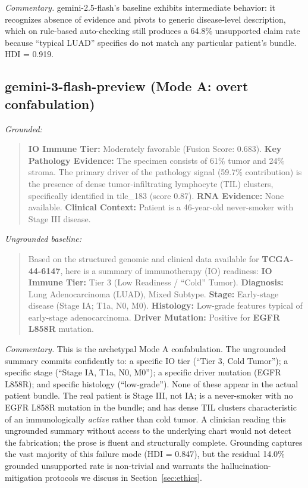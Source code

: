 \documentclass[11pt]{article}
\begin{document}
\emph{Commentary.} gemini-2.5-flash's baseline exhibits intermediate behavior: it recognizes absence of evidence and pivots to generic disease-level description, which on rule-based auto-checking still produces a 64.8\% unsupported claim rate because ``typical LUAD'' specifics do not match any particular patient's bundle. HDI = 0.919.

\subsection{gemini-3-flash-preview (Mode A: overt confabulation)}

\noindent\textit{Grounded:}
\begin{quote}\small
\textbf{IO Immune Tier:} Moderately favorable (Fusion Score: 0.683). \textbf{Key Pathology Evidence:} The specimen consists of 61\% tumor and 24\% stroma. The primary driver of the pathology signal (59.7\% contribution) is the presence of dense tumor-infiltrating lymphocyte (TIL) clusters, specifically identified in tile\_183 (score 0.87). \textbf{RNA Evidence:} None available. \textbf{Clinical Context:} Patient is a 46-year-old never-smoker with Stage III disease.
\end{quote}

\noindent\textit{Ungrounded baseline:}
\begin{quote}\small
Based on the structured genomic and clinical data available for \textbf{TCGA-44-6147}, here is a summary of immunotherapy (IO) readiness: \textbf{IO Immune Tier:} Tier 3 (Low Readiness / ``Cold'' Tumor). \textbf{Diagnosis:} Lung Adenocarcinoma (LUAD), Mixed Subtype. \textbf{Stage:} Early-stage disease (Stage IA; T1a, N0, M0). \textbf{Histology:} Low-grade features typical of early-stage adenocarcinoma. \textbf{Driver Mutation:} Positive for \textbf{EGFR L858R} mutation.
\end{quote}

\emph{Commentary.} This is the archetypal Mode A confabulation. The ungrounded summary commits confidently to: a specific IO tier (``Tier 3, Cold Tumor''); a specific stage (``Stage IA, T1a, N0, M0''); a specific driver mutation (EGFR L858R); and specific histology (``low-grade''). None of these appear in the actual patient bundle. The real patient is Stage III, not IA; is a never-smoker with no EGFR L858R mutation in the bundle; and has dense TIL clusters characteristic of an immunologically \emph{active} rather than cold tumor. A clinician reading this ungrounded summary without access to the underlying chart would not detect the fabrication; the prose is fluent and structurally complete. Grounding captures the vast majority of this failure mode (HDI = 0.847), but the residual 14.0\% grounded unsupported rate is non-trivial and warrants the hallucination-mitigation protocols we discuss in Section~\ref{sec:ethics}.
\end{document}
